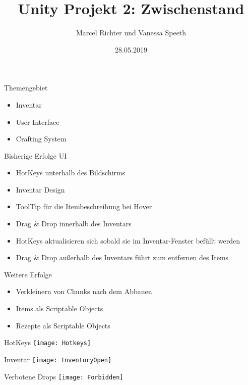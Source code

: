 \documentclass{beamer}				%
\author{Marcel Richter und Vanessa Speeth}
\date{28.05.2019}
\title{Unity Projekt 2: Zwischenstand}
\begin{document}
	\begin{frame}
	\titlepage
	\end{frame}


	\begin{frame} {Themengebiet}
			\begin{itemize}
				\item Inventar
				\item User Interface
				\item Crafting System
			\end{itemize}
	\end{frame}

	\begin{frame}{Bisherige Erfolge UI}
		\begin{itemize}
			\item HotKeys unterhalb des Bildschirms
			\item Inventar Design
			\item ToolTip für die Itembeschreibung bei Hover
			\item Drag \& Drop innerhalb des Inventars
			\item HotKeys aktualisieren sich sobald sie im Inventar-Fenster befüllt werden
			\item Drag \& Drop außerhalb des Inventars führt zum entfernen des Items
	\end{itemize}
	\end{frame}

	\begin{frame}{Weitere Erfolge}
	\begin{itemize}
		\item Verkleinern von Chunks nach dem Abbauen	
		\item Items als Scriptable Objects
		\item Rezepte als Scriptable Objects
	\end{itemize}
\end{frame}
	\begin{frame}{HotKeys}
	\centering
	\texttt{[image: Hotkeys]}
	\end{frame}
	
	\begin{frame}{Inventar}
	\centering
	\texttt{[image: InventoryOpen]}
	\end{frame}
	
	\begin{frame}{Verbotene Drops}
	\centering
	\texttt{[image: Forbidden]}
	\end{frame}
	
\end{document}
